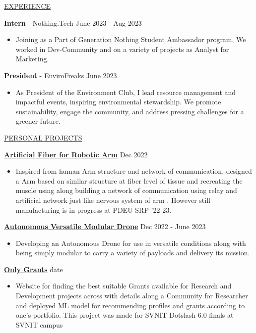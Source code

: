 \documentclass[11pt]{article}
\newcommand{\betteruline}[1]{
    \uline{#1}
}
\newcommand{\sectiontitle}[1]{
    \begingroup
        \titlebold
        \betteruline{\Large\uppercase{#1}  }
        \vspace{1.7mm}
    \endgroup
}
\newcommand{\sectioncontent}[1]{
    \begingroup
        \begin{FlushLeft}
        \vspace{-3mm}
        \sffamily\small#1
        \end{FlushLeft}
    \endgroup
    \vspace{2mm}
}
\newcommand{\job}[3]{
    \begingroup
        \textbf{\small#1} - \small#2
        \hfill\color{black!70}\small{#3}
    \endgroup
}
\newcommand{\project}[2]{
    \begingroup
        \textbf{\small#1}
        \hfill\color{black!70}\small{#2}
    \endgroup
}
\newcommand{\spacevv}{
    \vspace{2mm}
}
\begin{document}
\begin{paracol}{2}
    
    \switchcolumn

    \sectiontitle{experience}
    \sectioncontent{

      \job{Intern}{Nothing.Tech}{June 2023 - Aug 2023}
      \begin{itemize}
        \item Joining as a Part of Generation Nothing Student Ambassador program, We worked in Dev-Community and on a variety of projects as Analyst for Marketing. 
      \end{itemize}
      \spacevv

      \job{President}{EnviroFreaks}{June 2023}
      \begin{itemize}
        \item As President of the Environment Club, I lead resource management and impactful events, inspiring environmental stewardship. We promote sustainability, engage the community, and address pressing challenges for a greener future.
      \end{itemize}
    }

    \sectiontitle{personal projects}
    \sectioncontent{

        \project{\href{example.com}{Artificial Fiber for Robotic Arm}}{Dec 2022}
        \begin{itemize}
            \item Inspired from human Arm structure and network of communication, designed a Arm based on similar structure at fiber level of tissue and recreating the muscle using along building a network of communication using relay and artificial network just like nervous system of arm . However still manufacturing is in progress at PDEU SRP '22-23.
        \end{itemize}
        \spacevv
       
        \project{\href{example.com}{Autonomous Versatile Modular Drone}}{Dec 2022 - June 2023}
        \begin{itemize}
            \item  Developing an Autonomous Drone for use in versatile conditions along with being simply modular to carry a variety of payloads and delivery its mission.
        \end{itemize}
        \spacevv

        \project{\href{example.com}{Only Grants}}{date}
        \begin{itemize}
            \item Website for finding the best suitable Grants available for Research and Development projects across with details along a Community for Researcher and deployed ML model for recommending profiles and grants according to one's portfolio. This project was made for SVNIT Dotslash 6.0 finals at SVNIT campus
        \end{itemize}
        \spacevv

}
\end{paracol}
\end{document}

